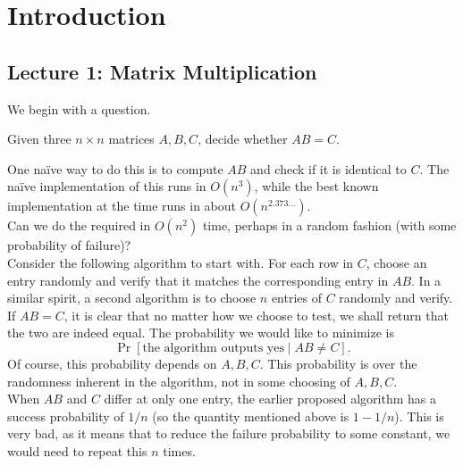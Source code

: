 \section{Introduction}

	\subsection{Lecture 1: Matrix Multiplication}

		We begin with a question.

		\begin{problem*}
			Given three $n\times n$ matrices $A,B,C$, decide whether $AB = C$. 
		\end{problem*}

		One na\"{i}ve way to do this is to compute $AB$ and check if it is identical to $C$. The na\"{i}ve implementation of this runs in $O(n^3)$, while the best known implementation at the time runs in about $O(n^{2.373\ldots})$. \\
		Can we do the required in $O(n^2)$ time, perhaps in a random fashion (with some probability of failure)?\\

		Consider the following algorithm to start with. For each row in $C$, choose an entry randomly and verify that it matches the corresponding entry in $AB$. In a similar spirit, a second algorithm is to choose $n$ entries of $C$ randomly and verify.\\

		If $AB = C$, it is clear that no matter how we choose to test, we shall return that the two are indeed equal. The probability we would like to minimize is
		\[ \Pr[\text{the algorithm outputs yes} \mid AB \ne C]. \]
		Of course, this probability depends on $A,B,C$. This probability is over the randomness inherent in the algorithm, not in some choosing of $A,B,C$. \\

		When $AB$ and $C$ differ at only one entry, the earlier proposed algorithm has a success probability of $1/n$ (so the quantity mentioned above is $1-1/n$). This is very bad, as it means that to reduce the failure probability to some constant, we would need to repeat this $n$ times.\\

